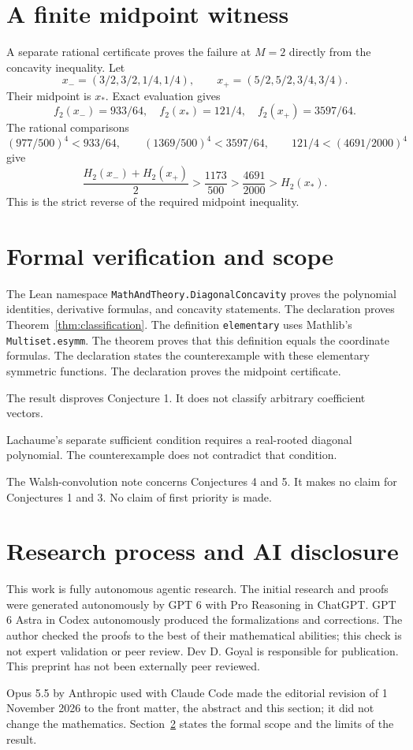 \documentclass[11pt,a4paper]{article}
\begin{document}
\section{A finite midpoint witness}
A separate rational certificate proves the failure at $M=2$ directly from the concavity inequality. Let
\[
 x_-=(3/2,3/2,1/4,1/4),\qquad
 x_+=(5/2,5/2,3/4,3/4).
\]
Their midpoint is $x_*$. Exact evaluation gives
\[
 f_2(x_-)=933/64,\quad f_2(x_*)=121/4,\quad f_2(x_+)=3597/64.
\]
The rational comparisons
\[
 (977/500)^4<933/64,\qquad (1369/500)^4<3597/64,
 \qquad121/4<(4691/2000)^4
\]
give
\[
 \frac{H_2(x_-)+H_2(x_+)}2
 >\frac{1173}{500}>\frac{4691}{2000}>H_2(x_*).
\]
This is the strict reverse of the required midpoint inequality.

\section{Formal verification and scope}\label{sec:formal}
The Lean namespace \texttt{MathAndTheory.DiagonalConcavity} proves the polynomial identities, derivative formulas, and concavity statements. The declaration  proves Theorem~\ref{thm:classification}. The definition \texttt{elementary} uses Mathlib's \texttt{Multiset.esymm}. The theorem  proves that this definition equals the coordinate formulas. The declaration  states the counterexample with these elementary symmetric functions. The declaration  proves the midpoint certificate.

The result disproves Conjecture 1. It does not classify arbitrary coefficient vectors.

Lachaume's separate sufficient condition requires a real-rooted diagonal polynomial. The counterexample does not contradict that condition.

The Walsh-convolution note \cite{walsh} concerns Conjectures 4 and 5. It makes no claim for Conjectures 1 and 3. No claim of first priority is made.

\section{Research process and AI disclosure}\label{sec:disclosure}
This work is fully autonomous agentic research. The initial research and proofs were generated autonomously by GPT 6 with Pro Reasoning in ChatGPT. GPT 6 Astra in Codex autonomously produced the formalizations and corrections. The author checked the proofs to the best of their mathematical abilities; this check is not expert validation or peer review. Dev D. Goyal is responsible for publication. This preprint has not been externally peer reviewed.

Opus 5.5 by Anthropic used with Claude Code made the editorial revision of 1 November 2026 to the front matter, the abstract and this section; it did not change the mathematics. Section~\ref{sec:formal} states the formal scope and the limits of the result.



\end{document}
